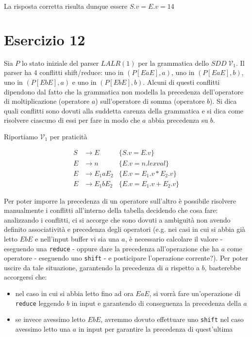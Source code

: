 \documentclass[class=book, crop=false, oneside, 12pt]{standalone}
\begin{document}
La risposta corretta risulta dunque essere \(S.v = E.v = 14\)

\section*{Esercizio 12}

Sia \(P\) lo  stato  iniziale  del  parser  \(LALR(1)\)  per  la  grammatica  dello  \(SDD \; \mathcal{V}_1\). Il parser ha 4  conflitti shift/reduce:  uno in \((P[EaE],a)\), uno in \((P[EaE],b)\), uno in \((P[EbE],a)\) e uno in \((P[EbE],b)\).   Alcuni di  questi  conflitti  dipendono  dal  fatto  che  la  grammatica  non  modella  la  precedenza  dell'operatore  di moltiplicazione (operatore \(a\)) sull'operatore di somma (operatore \(b\)).  Si dica quali conflitti sono dovuti alla suddetta carenza della grammatica e si dica come risolvere ciascuno di essi per fare in modo che \(a\) abbia precedenza su \(b\).

Riportiamo \(\mathcal{V}_1\) per praticità

\begin{align*}
    S &\to E &\{S.v = E.v\} \\
    E &\to n &\{E.v = n.lexval\} \\
    E &\to E_1 a E_2 &\{E.v = E_1.v * E_2.v\} \\
    E &\to E_1 b E_2 &\{E.v = E_1.v + E_2.v\} 
\end{align*}

Per poter imporre la precedenza di un operatore sull'altro è possibile risolvere manualmente i conflitti all'interno della tabella decidendo che cosa fare: analizzando i conflitti, ci si accorge che sono dovuti a ambiguità non avendo definito associatività e precedenza degli operatori (e.g. nei casi in cui si abbia già letto \(EbE\) e nell'input buffer vi sia una \(a\), è necessario calcolare il valore - eseguendo una \texttt{reduce} - oppure dare la precedenza all'operazione che ha \(a\) come operatore - eseguendo uno \texttt{shift} - e posticipare l'operazione corrente?). Per poter uscire da tale situazione, garantendo la precedenza di \(a\) rispetto a \(b\), basterebbe accorgersi che:

\begin{itemize}
    \item nel caso in cui si abbia letto fino ad ora \(EaE\), si vorrà fare un'operazione di \texttt{reduce} leggendo \(b\) in input e garantendo di conseguenza la precedenza della \(a\)
    \item se invece avessimo letto \(EbE\), avremmo dovuto effettuare uno \texttt{shift} nel caso avessimo letto una \(a\) in input per garantire la precedenza di quest'ultima
\end{itemize}
\end{document}
